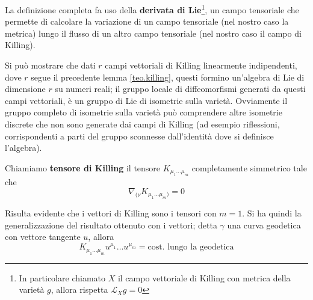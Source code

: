 La definizione completa fa uso della \textbf{derivata di Lie}\footnote{In particolare chiamato $X$ il campo vettoriale di Killing con metrica della varietà $g$, allora rispetta $\mathcal{L}_X g=0$}, un campo tensoriale che permette di calcolare la variazione di un campo tensoriale (nel nostro caso la metrica) lungo il flusso di un altro campo tensoriale (nel nostro caso il campo di Killing).

Si può mostrare che dati $r$ campi vettoriali di Killing linearmente indipendenti, dove $r$ segue il precedente lemma \ref{teo.killing}, questi formino un'algebra di Lie di dimensione $r$ su numeri reali; il gruppo locale di diffeomorfismi generati da questi campi vettoriali, è un gruppo di Lie di isometrie sulla varietà. Ovviamente il gruppo completo di isometrie sulla varietà può comprendere altre isometrie discrete che non sono generate dai campi di Killing (ad esempio riflessioni, corrispondenti a parti del gruppo sconnesse dall'identità dove si definisce l'algebra).

\begin{definizione}
Chiamiamo \textbf{tensore di Killing} il tensore $K_{\mu_1\dots\mu_m}$ completamente simmetrico tale che
\begin{equation*}
    \nabla_{(\nu}K_{\mu_1\dots\mu_m)} = 0
\end{equation*}
\end{definizione}
Risulta evidente che i vettori di Killing sono i tensori con $m=1$.
Si ha quindi la generalizzazione del risultato ottenuto con i vettori; detta $\gamma$ una curva geodetica con vettore tangente $u$, allora
\begin{equation*}
    K_{\mu_1\dots\mu_m} u^{\mu_1}\dots u^{\mu_m} = \textrm{cost. lungo la geodetica}
\end{equation*}

